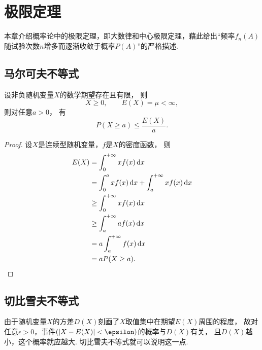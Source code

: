 \chapter{极限定理}
本章介绍概率论中的极限定理，即大数律和中心极限定理，藉此给出“频率\(f_n(A)\)随试验次数\(n\)增多而逐渐收敛于概率\(P(A)\)”的严格描述.

\section{马尔可夫不等式}
\begin{theorem}[马尔可夫不等式]
设非负随机变量\(X\)的数学期望存在且有限，
则\begin{equation*}
	X \geq 0,
	\qquad
	E(X) = \mu < \infty,
\end{equation*}
则对任意\(a > 0\)，
有\begin{equation}
	P(X \geq a) \leq \frac{E(X)}{a}.
\end{equation}
\begin{proof}
设\(X\)是连续型随机变量，\(f\)是\(X\)的密度函数，
则\begin{align*}
	E(X) &= \int_0^{+\infty} x f(x) \dd{x} \\
	&= \int_0^a x f(x) \dd{x}
	+ \int_a^{+\infty} x f(x) \dd{x} \\
	&\geq \int_0^{+\infty} x f(x) \dd{x} \\
	&\geq \int_a^{+\infty} a f(x) \dd{x} \\
	&= a \int_a^{+\infty} f(x) \dd{x} \\
	&= a P(X \geq a).
	\qedhere
\end{align*}
\end{proof}
\end{theorem}

\section{切比雪夫不等式}
由于随机变量\(X\)的方差\(D(X)\)刻画了\(X\)取值集中在期望\(E(X)\)周围的程度，
故对任意\(\epsilon>0\)，事件\((\abs{X - E(X)} < \epsilon)\)的概率与\(D(X)\)有关，
且\(D(X)\)越小，这个概率就应越大.
切比雪夫不等式就可以说明这一点.

